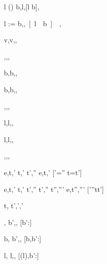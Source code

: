 
	{l \not\in {}(\sigma)}
	{\New b,\sigma \normalise \Done l,[l \mapsto b]\sigma,\nothing}

	{}
	{l := b,\sigma \normalise \Done \unit,[l \mapsto b]\sigma,}



  { }
  {\Done v,\sigma \normalise \Done v,\sigma,\nothing}

  { }
  {\Enter \beta,\sigma \normalise \Enter \beta,\sigma,\nothing}

  { }
  {\Update b,\sigma \normalise \Update b,\sigma,\nothing}

  { }
  {\View b,\sigma \normalise \View b,\sigma,\nothing}

  { }
  {\Pick {},\sigma \normalise \Pick {},\sigma,\nothing}

  { }
  {\Change l,\sigma \normalise \Change l,\sigma,\nothing}

  { }
  {\Watch l,\sigma \normalise \Watch l,\sigma,\nothing}

  { }
  {\Fail,\sigma \normalise \Fail,\sigma,\nothing}






    {e,\sigma \eval t,\sigma' \Quad
     t,\sigma' \stride t',\sigma''}
    {e,\sigma \normalise t,\sigma'}
    [\sigma'=\sigma'' \land t=t']

    {e,\sigma \eval t,\sigma'  \Quad
     t,\sigma' \stride t',\sigma''  \Quad
     t',\sigma'' \normalise t'',\sigma'''}
    {e,\sigma \normalise t'',\sigma'''}
    [\sigma'\neq \sigma''\vee t\neq t']





  {t,\sigma {} t',\sigma',\delta'}



  { }
  {\Enter \beta,\sigma {} \Update b',\sigma,\nothing}
  [b':\beta]

  { }
  {\Update b,\sigma {} \Update b',\sigma,\nothing}
  [b,b':\beta]

  { }
  {\Change l,\sigma {} \Change l,\sigma[l \mapsto b'],}
  [\sigma(l),b':\beta]


